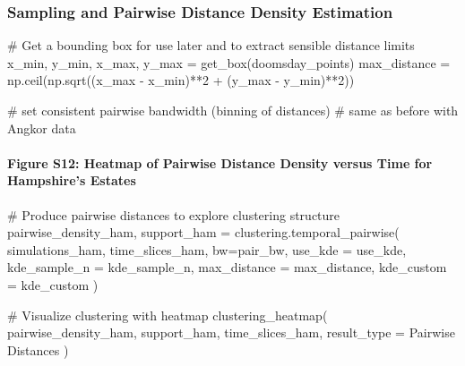 \documentclass[
  11pt,
  letterpaper,
  DIV=11,
  numbers=noendperiod]{scrartcl}
\let\oldparagraph\paragraph
\renewcommand{\paragraph}[1]{\oldparagraph{#1}\mbox{}}
\newenvironment{Shaded}{\begin{snugshade}}{\end{snugshade}}
\newcommand{\CommentTok}[1]{\textcolor[rgb]{0.37,0.37,0.37}{#1}}
\newcommand{\DecValTok}[1]{\textcolor[rgb]{0.68,0.00,0.00}{#1}}
\newcommand{\NormalTok}[1]{\textcolor[rgb]{0.00,0.23,0.31}{#1}}
\newcommand{\OperatorTok}[1]{\textcolor[rgb]{0.37,0.37,0.37}{#1}}
\newcommand{\StringTok}[1]{\textcolor[rgb]{0.13,0.47,0.30}{#1}}
\begin{document}
\subsubsection{Sampling and Pairwise Distance Density
Estimation}\label{sampling-and-pairwise-distance-density-estimation}

\begin{Shaded}
\begin{Highlighting}[]
\CommentTok{\# Get a bounding box for use later and to extract sensible distance limits}
\NormalTok{x\_min, y\_min, x\_max, y\_max }\OperatorTok{=}\NormalTok{ get\_box(doomsday\_points)}
\NormalTok{max\_distance }\OperatorTok{=}\NormalTok{ np.ceil(np.sqrt((x\_max }\OperatorTok{{-}}\NormalTok{ x\_min)}\OperatorTok{**}\DecValTok{2} \OperatorTok{+}\NormalTok{ (y\_max }\OperatorTok{{-}}\NormalTok{ y\_min)}\OperatorTok{**}\DecValTok{2}\NormalTok{))}

\CommentTok{\# set consistent pairwise bandwidth (binning of distances)}
\CommentTok{\# same as before with Angkor data}
\end{Highlighting}
\end{Shaded}

\paragraph{Figure S12: Heatmap of Pairwise Distance Density versus Time
for Hampshire's
Estates}\label{figure-s12-heatmap-of-pairwise-distance-density-versus-time-for-hampshires-estates}

\begin{Shaded}
\begin{Highlighting}[]
\CommentTok{\# Produce pairwise distances to explore clustering structure}
\NormalTok{pairwise\_density\_ham, support\_ham }\OperatorTok{=}\NormalTok{ clustering.temporal\_pairwise(}
\NormalTok{    simulations\_ham, }
\NormalTok{    time\_slices\_ham, }
\NormalTok{    bw}\OperatorTok{=}\NormalTok{pair\_bw, }
\NormalTok{    use\_kde }\OperatorTok{=}\NormalTok{ use\_kde, }
\NormalTok{    kde\_sample\_n }\OperatorTok{=}\NormalTok{ kde\_sample\_n,}
\NormalTok{    max\_distance }\OperatorTok{=}\NormalTok{ max\_distance,}
\NormalTok{    kde\_custom }\OperatorTok{=}\NormalTok{ kde\_custom}
\NormalTok{)}

\CommentTok{\# Visualize clustering with heatmap}
\NormalTok{clustering\_heatmap(}
\NormalTok{    pairwise\_density\_ham,}
\NormalTok{    support\_ham,}
\NormalTok{    time\_slices\_ham,}
\NormalTok{    result\_type }\OperatorTok{=} \StringTok{\textquotesingle{}Pairwise Distances\textquotesingle{}}
\NormalTok{)}
\end{Highlighting}
\end{Shaded}
\end{document}
